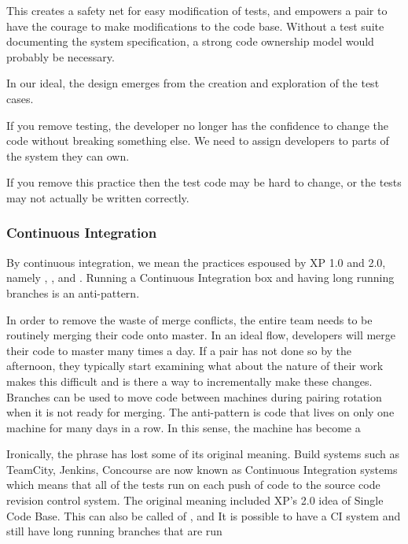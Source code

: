 This creates a safety net for easy modification of tests, and empowers a pair to have the courage to make modifications to the code base. Without a test suite documenting the system specification, a strong code ownership model would probably be necessary.

In our ideal, the design emerges from the creation and exploration of the test cases.  

If you remove testing, the developer no longer has the confidence to change the code without breaking something else. We need to assign developers to parts of the system they can own.

If you remove this practice then the test code may be hard to change, or the tests may not actually be written correctly.

\subsubsection{Continuous Integration}
By continuous integration, we mean the practices espoused by XP 1.0 and 2.0, namely , , and . Running a Continuous Integration box and having long running branches is an anti-pattern.

In order to remove the waste of merge conflicts, the entire team needs to be routinely merging their code onto master.  In an ideal flow, developers will merge their code to master many times a day. If a pair has not done so by the afternoon, they typically start examining what about the nature of their work makes this difficult and is there a way to incrementally make these changes. 
Branches can be used to move code between machines during pairing rotation when it is not ready for merging.  The anti-pattern is code that lives on only one machine for many days in a row. In this sense, the machine has become a  

Ironically, the phrase  has lost some of its original meaning. Build systems such as TeamCity, Jenkins, Concourse are now known as Continuous Integration systems which means that all of the tests run on each push of code to the source code revision control system. The original meaning included XP's 2.0 idea of Single Code Base. This can also be called  of   ,  and It is possible to have a CI system and still have long running branches that are run 

